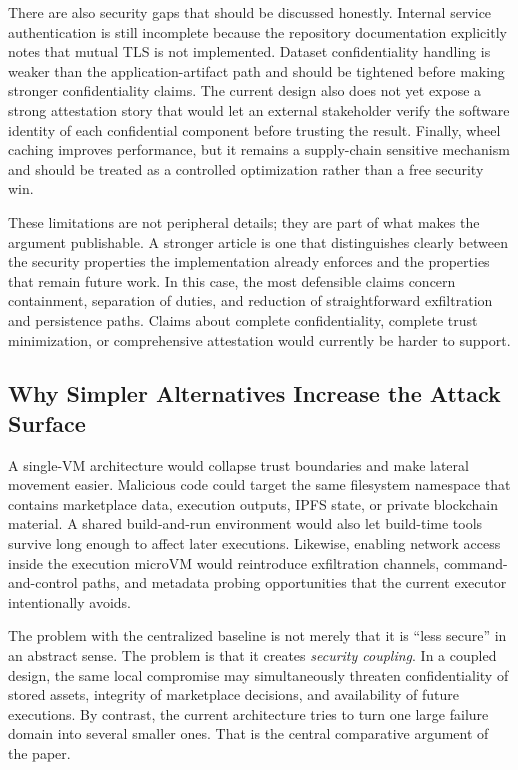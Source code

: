 \documentclass[sigconf,nonacm]{acmart}
\begin{document}
There are also security gaps that should be discussed honestly. Internal service authentication is still incomplete because the repository documentation explicitly notes that mutual TLS is not implemented. Dataset confidentiality handling is weaker than the application-artifact path and should be tightened before making stronger confidentiality claims. The current design also does not yet expose a strong attestation story that would let an external stakeholder verify the software identity of each confidential component before trusting the result. Finally, wheel caching improves performance, but it remains a supply-chain sensitive mechanism and should be treated as a controlled optimization rather than a free security win.

These limitations are not peripheral details; they are part of what makes the argument publishable. A stronger article is one that distinguishes clearly between the security properties the implementation already enforces and the properties that remain future work. In this case, the most defensible claims concern containment, separation of duties, and reduction of straightforward exfiltration and persistence paths. Claims about complete confidentiality, complete trust minimization, or comprehensive attestation would currently be harder to support.

\subsection{Why Simpler Alternatives Increase the Attack Surface}

A single-VM architecture would collapse trust boundaries and make lateral movement easier. Malicious code could target the same filesystem namespace that contains marketplace data, execution outputs, IPFS state, or private blockchain material. A shared build-and-run environment would also let build-time tools survive long enough to affect later executions. Likewise, enabling network access inside the execution microVM would reintroduce exfiltration channels, command-and-control paths, and metadata probing opportunities that the current executor intentionally avoids.

The problem with the centralized baseline is not merely that it is ``less secure'' in an abstract sense. The problem is that it creates \emph{security coupling}. In a coupled design, the same local compromise may simultaneously threaten confidentiality of stored assets, integrity of marketplace decisions, and availability of future executions. By contrast, the current architecture tries to turn one large failure domain into several smaller ones. That is the central comparative argument of the paper.
\end{document}
